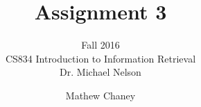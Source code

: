 \documentclass[10pt,letterpaper,bibliography=totocnumbered]{scrartcl}
\begin{document}
\author{Mathew Chaney}
\title{Assignment 3}
\subtitle{Fall 2016\\ CS834 Introduction to Information Retrieval\\ Dr. Michael Nelson}
\maketitle
\newpage

\tableofcontents
\listoffigures
\lstlistoflistings
\listoftables











\end{document}
